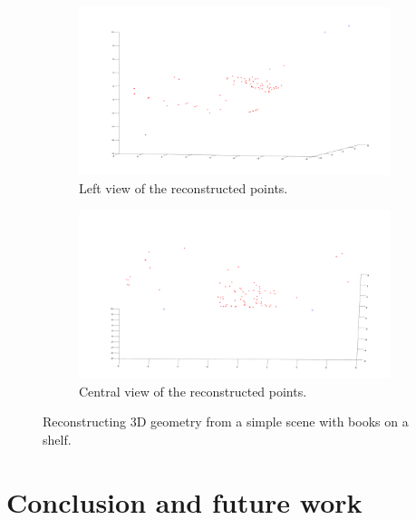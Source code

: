 \documentclass[12pt]{article}
\begin{document}
\begin{figure}[htbp]
		\ContinuedFloat
		\centering        
        \begin{subfigure}[b]{0.49\textwidth}
                \includegraphics[width=\textwidth]{images/reconstruction3}
                \caption{Left view of the reconstructed points.}
                \label{fig:stereoRecons2}
        \end{subfigure}
        \begin{subfigure}[b]{0.49\textwidth}
                \includegraphics[width=\textwidth]{images/reconstruction2}
                \caption{Central view of the reconstructed points.}
                \label{fig:stereoRecons3}
        \end{subfigure}
        \caption{Reconstructing 3D geometry from a simple scene with books on a shelf.}\label{fig:stereoReconstruction}
\end{figure}

\FloatBarrier
\section{Conclusion and future work}
\end{document}
